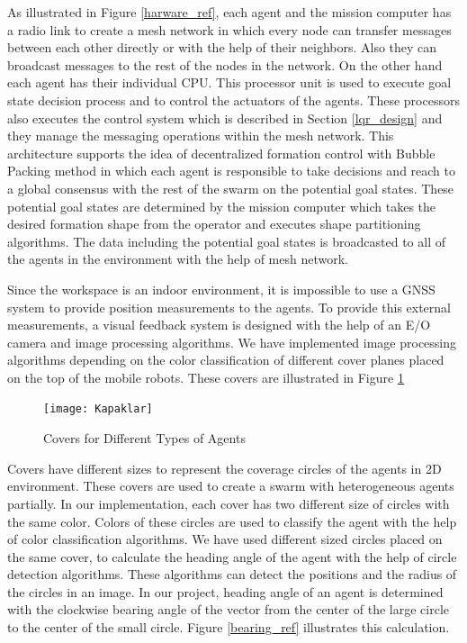 As illustrated in Figure \ref{harware_ref}, each agent and the mission computer has a radio link to create a mesh network in which every node can transfer messages between each other directly or with the help of their neighbors. Also they can broadcast messages to the rest of the nodes in the network.  On the other hand each agent has their individual CPU. This processor unit is used to execute goal state decision process and to control the actuators of the agents. These processors also executes the control system which is described in Section \ref{lqr_design} and they manage the messaging operations within the mesh network.  This architecture supports the idea of decentralized formation control with Bubble Packing method in which each agent is responsible to take decisions and reach to a global consensus with the rest of the swarm on the potential goal states.  These potential goal states are determined by the mission computer which takes the desired formation shape from the operator and executes shape partitioning algorithms. The data including the potential goal states is broadcasted to all of the agents in the environment with the help of mesh network. 

Since the workspace is an indoor environment, it is impossible to use a GNSS system to provide position measurements to the agents. To provide this external measurements, a visual feedback system is designed with the help of an E/O camera and image processing algorithms. We have implemented image processing algorithms depending on the color classification of different cover planes placed on the top of the mobile robots. These covers are illustrated in Figure \ref{kapaklar_ref}

\begin{figure}[H]
\caption{Covers for Different Types of Agents} \label{kapaklar_ref}
\centerline{\texttt{[image: Kapaklar]}}
\end{figure} 
		
Covers have different sizes to represent the coverage circles of the agents in 2D environment. These covers are used to create a swarm with heterogeneous agents partially. In our implementation, each cover has two different size of circles with the same color. Colors of these circles are used to classify the agent with the help of color classification algorithms. We have used different sized circles placed on the same cover, to calculate the heading angle of the agent with the help of circle detection algorithms. These algorithms can detect the positions and the radius of the circles in an image. In our project, heading angle of an agent is determined with the clockwise bearing angle of the vector from the center of the large circle to the center of the small circle. Figure \ref{bearing_ref} illustrates this calculation.
		
